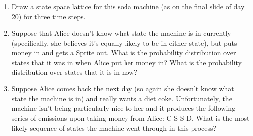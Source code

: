 \documentclass[fleqn]{hermans-hw}
\begin{document}
\begin{enumerate}
\item Draw a state space lattice for this soda machine (as on the final slide of day 20) for three time steps.


\item Suppose that Alice doesn't know what state the machine is in
  currently (specifically, she believes it's equally likely to be in
  either state), but puts money in and gets a Sprite out.  What is the
  probability distribution over states that it was in when Alice put
  her money in?  What is the probability distribution over states that
  it is in now?

\item Suppose Alice comes back the next day (so again she doesn't know
  what state the machine is in) and really wants a diet coke.
  Unfortunately, the machine isn't being particularly nice to her and
  it produces the following series of emissions upon taking money from
  Alice: C S S D.  What is the most likely sequence of states the
  machine went through in this process?
\end{enumerate}
\end{document}
